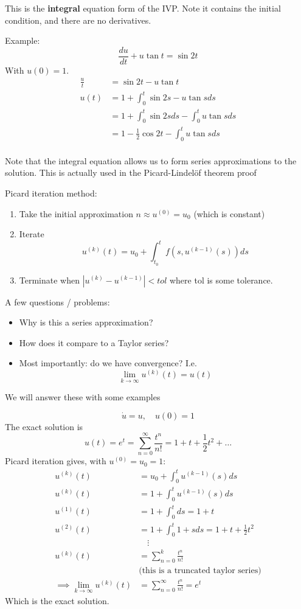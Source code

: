 \documentclass{X:/Documents/Coding/Latex/myassignment}
\begin{document}
This is the \textbf{integral} equation form of the IVP. Note it contains the initial condition, and there are no derivatives.

Example:
\[\frac{du}{dt} + u\tan t = \sin 2t\]
With $u(0) = 1$.
\begin{align*}
    \frac{u}{t} &= \sin 2t - u\tan t\\
    u(t) &= 1 + \int_{0}^t \sin 2s - u\tan s ds\\
        &= 1 + \int_0^t \sin 2s ds - \int_0^t u\tan s ds\\
        &= 1 -\frac12 \cos 2t - \int_0^t u\tan s ds\\
\end{align*}

Note that the integral equation allows us to form series approximations to the solution. This is actually used in the Picard-Lindel\"of theorem proof


Picard iteration method:
\begin{enumerate}
    \item Take the initial approximation $n\approx u^{(0)} = u_0$ (which is constant)
    \item Iterate
    \[u^{(k)}(t) =u_0 + \int_{t_0}^t f(s,u^{(k-1)}(s))ds \]
    \item Terminate when $|u^{(k)} - u^{(k-1)}| < tol $ where tol is some tolerance.
\end{enumerate}

A few questions / problems:
\begin{itemize}
    \item Why is this a series approximation?
    \item How does it compare to a Taylor series?
    \item Most importantly: do we have convergence? I.e.
    \[\lim_{k\to\infty} u^{(k)}(t) = u(t)\]
\end{itemize}

We will answer these with some examples

\[\dot u = u, \quad u(0) = 1\]
The exact solution is 
\[u(t) = e^t = \sum_{n=0}^\infty \frac{t^n}{n!} = 1+ t +\frac12 t^2 + \hdots\]
Picard iteration gives, with $u^{(0)} = u_0 = 1$:
\begin{align*}
    u^{(k)}(t) &= u_0 + \int_0^t u^{(k-1)}(s) ds\\
    u^{(k)}(t) &= 1 + \int_0^t u^{(k-1)}(s) ds\\
    u^{(1)}(t) &= 1 + \int_0^t ds = 1 + t\\
    u^{(2)}(t) &= 1 + \int_0^t 1+s ds = 1 + t + \frac12 t^2\\
    &\quad \vdots\\
    u^{(k)}(t) &= \sum_{n=0}^k \frac{t^n}{n!}\\
    &\text{(this is a truncated taylor series)}\\
    \implies \lim_{k\to\infty} u^{(k)}(t) &= \sum_{n=0}^\infty \frac{t^n}{n!} = e^{t}
\end{align*}
Which is the exact solution.
\end{document}
